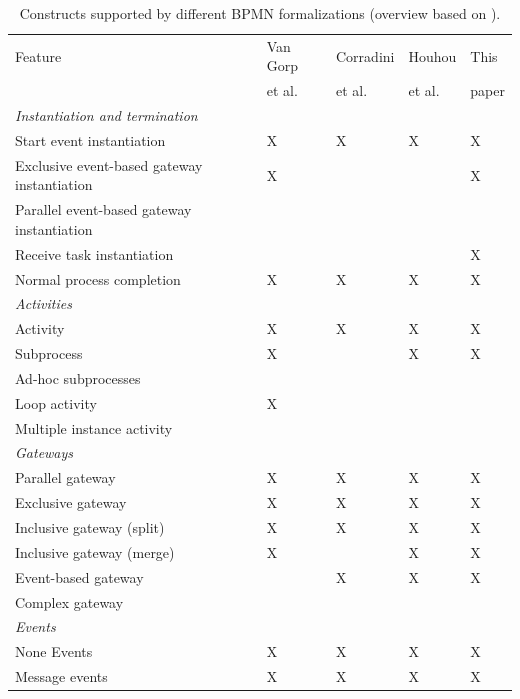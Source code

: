 \documentclass[runningheads]{llncs}
\begin{document}
\begin{table}[htbp]
    \caption{Constructs supported by different BPMN formalizations (overview based on \cite{vangorpVisualTokenbasedFormalization2013}).}
    \label{tab:supportedconstructs}
    \begin{threeparttable}
    \begin{tabular}{l l l l l}
    \hline
      Feature & Van Gorp &  Corradini & Houhou & This\\
      & et al. \cite{vangorpVisualTokenbasedFormalization2013} & et al. \cite{corradiniFormalApproachAnalysis2021}& et al. \cite{houhouFirstOrderLogicVerification2022} & paper\\
      \hline
      \textit{Instantiation and termination} & &\\
      Start event instantiation & X & X & X & X\\
      Exclusive event-based gateway instantiation & X & & & X\\
      Parallel event-based gateway instantiation &  & & & \\
      Receive task instantiation & & & & X\\
      Normal process completion & X & X & X & X\\
      \textit{Activities} & & & &\\
      Activity & X & X & X & X\\
      Subprocess & X & & X & X\\
      Ad-hoc subprocesses & & & &\\
      Loop activity & X & & &\\
      Multiple instance activity & & & & \\
      \textit{Gateways} & & & &\\
      Parallel gateway & X & X & X & X\\
      Exclusive gateway & X & X & X & X\\
      Inclusive gateway (split) & X & X & X & X\\
      Inclusive gateway (merge) & X & & X & X\\
      Event-based gateway &  & X\tnote{1} & X & X\\ %
      Complex gateway & & & &\\
      \textit{Events} & & & & \\
      None Events & X & X & X & X\\
      Message events & X & X & X & X\\

\end{tabular}
\end{threeparttable}
\end{table}
\end{document}

